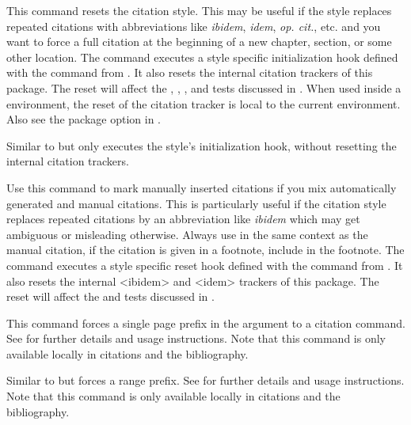 \begin{ltxsyntax}


This command resets the citation style. This may be useful if the style replaces repeated citations with abbreviations like \emph{ibidem}, \emph{idem}, \emph{op. cit.}, etc. and you want to force a full citation at the beginning of a new chapter, section, or some other location. The command executes a style specific initialization hook defined with the  command from . It also resets the internal citation trackers of this package. The reset will affect the , , , and  tests discussed in . When used inside a  environment, the reset of the citation tracker is local to the current  environment. Also see the  package option in .


Similar to  but only executes the style's initialization hook, without resetting the internal citation trackers.


Use this command to mark manually inserted citations if you mix automatically generated and manual citations. This is particularly useful if the citation style replaces repeated citations by an abbreviation like \emph{ibidem} which may get ambiguous or misleading otherwise. Always use  in the same context as the manual citation, \eg if the citation is given in a footnote, include  in the footnote. The  command executes a style specific reset hook defined with the  command from . It also resets the internal <ibidem> and <idem> trackers of this package. The reset will affect the  and  tests discussed in .


This command forces a single page prefix in the  argument to a citation command. See  for further details and usage instructions. Note that this command is only available locally in citations and the bibliography.


Similar to  but forces a range prefix. See  for further details and usage instructions. Note that this command is only available locally in citations and the bibliography.


\end{ltxsyntax}
